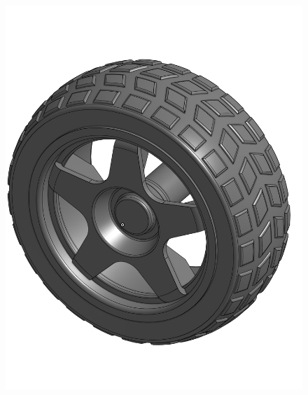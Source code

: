 \documentclass[a4paper,12pt]{article}
\begin{document}
\begin{center}
\begin{figure}[H]
\begin{minipage}[t]{0.45\textwidth}
\includegraphics[width=\textwidth]{./model_images/6.png}
\end{minipage}
\hfill
\end{figure}\FloatBarrier\end{center}
\end{document}
